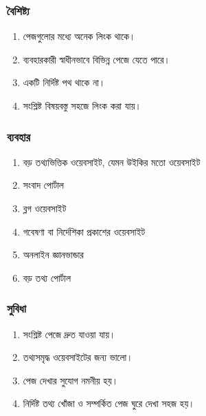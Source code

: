 \par\noindent
\begin{minipage}[t]{.48\linewidth}\vspace{0pt}
\subsubsection{বৈশিষ্ট্য}

\begin{enumerate}
\item পেজগুলোর মধ্যে অনেক লিংক থাকে।
\item ব্যবহারকারী স্বাধীনভাবে বিভিন্ন পেজে যেতে পারে।
\item একটি নির্দিষ্ট পথ থাকে না।
\item সংশ্লিষ্ট বিষয়বস্তু সহজে লিংক করা যায়।
\end{enumerate}
\end{minipage}\hfill
\begin{minipage}[t]{.48\linewidth}\vspace{0pt}
\subsubsection{ব্যবহার}

\begin{enumerate}
\item বড় তথ্যভিত্তিক ওয়েবসাইট, যেমন উইকির মতো ওয়েবসাইট
\item সংবাদ পোর্টাল
\item ব্লগ ওয়েবসাইট
\item গবেষণা বা নির্দেশিকা প্রকাশের ওয়েবসাইট
\item অনলাইন জ্ঞানভান্ডার
\item বড় তথ্য পোর্টাল
\end{enumerate}
\end{minipage}\par\smallskip
\par\noindent
\begin{minipage}[t]{.48\linewidth}\vspace{0pt}
\subsubsection{সুবিধা}
\begin{enumerate}
\item সংশ্লিষ্ট পেজে দ্রুত যাওয়া যায়।
\item তথ্যসমৃদ্ধ ওয়েবসাইটের জন্য ভালো।
\item পেজ দেখার সুযোগ নমনীয় হয়।
\item নির্দিষ্ট তথ্য খোঁজা ও সম্পর্কিত পেজ ঘুরে দেখা সহজ হয়।
\end{enumerate}
\end{minipage}\hfill
